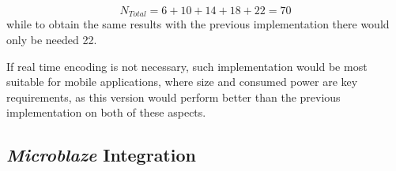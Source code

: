 \begin{equation}
    N_{Total} = 6+10+14+18+22 = 70
\end{equation}
while to obtain the same results with the previous implementation there would only be needed 22.

If real time encoding is not necessary, such implementation would be most suitable for mobile applications, where size and consumed power are key requirements, as this version would perform better than the previous implementation on both of these aspects.






\subsection{\emph{Microblaze} Integration} \label{sec:microblaze}

